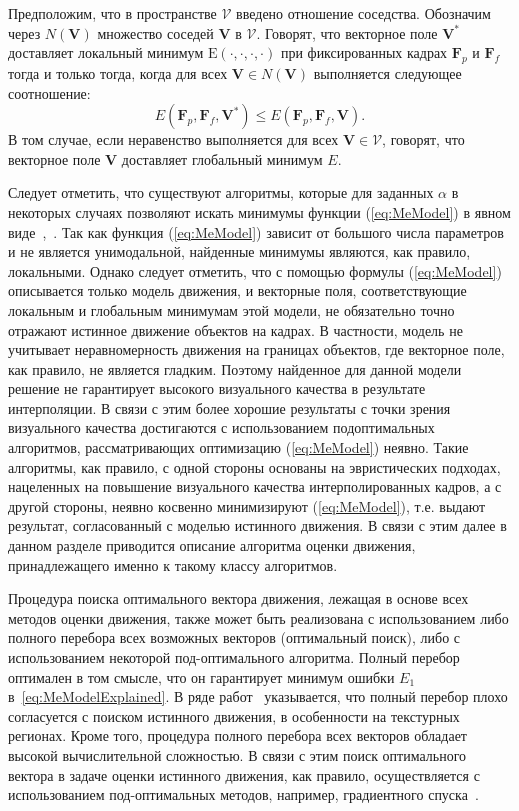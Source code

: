 Предположим, что в пространстве $\mathcal{V}$ введено отношение соседства. Обозначим через $N(\mathbf{V})$ множество соседей $\mathbf{V}$ в $\mathcal{V}$. Говорят, что векторное поле $\mathbf{V}^*$ доставляет локальный минимум $\mathrm{E}(\cdot,\cdot,\cdot,\cdot)$ при фиксированных кадрах $\mathbf{F}_p$ и $\mathbf{F}_f$ тогда и только тогда, когда для всех $\mathbf{V} \in N(\mathbf{V})$ выполняется следующее соотношение:
\begin{equation}
E(\mathbf{F}_p, \mathbf{F}_f, \mathbf{V}^{*}) \le E(\mathbf{F}_p, \mathbf{F}_f, \mathbf{V}).
\label{eq:Minima}
\end{equation}
В том случае, если неравенство выполняется для всех $\mathbf{V} \in \mathcal{V}$, говорят, что векторное поле $\mathbf{V}$ доставляет глобальный минимум $E$.

Следует отметить, что существуют алгоритмы, которые для заданных $\alpha$ в некоторых случаях позволяют искать минимумы функции (\ref{eq:MeModel}) в явном виде~\cite{Boykov2004},~\cite{Morales2009}. Так как функция (\ref{eq:MeModel}) зависит от большого числа параметров и не является унимодальной, найденные минимумы являются, как правило, локальными. Однако следует отметить, что с помощью формулы (\ref{eq:MeModel}) описывается только модель движения, и векторные поля, соответствующие локальным и глобальным минимумам этой модели, не обязательно точно отражают истинное движение объектов на кадрах. В частности, модель не учитывает неравномерность движения на границах объектов, где векторное поле, как правило, не является гладким. Поэтому найденное для данной модели решение не гарантирует высокого визуального качества в результате интерполяции. В связи с этим более хорошие результаты с точки зрения визуального качества достигаются с использованием подоптимальных алгоритмов, рассматривающих оптимизацию (\ref{eq:MeModel}) неявно. Такие алгоритмы, как правило, с одной стороны основаны на эвристических подходах, нацеленных на повышение визуального качества интерполированных кадров, а с другой стороны, неявно косвенно минимизируют (\ref{eq:MeModel}), т.е. выдают результат, согласованный с моделью истинного движения. В связи с этим далее в данном разделе приводится описание алгоритма оценки движения, принадлежащего именно к такому классу алгоритмов.

Процедура поиска оптимального вектора движения, лежащая в основе всех методов оценки движения, также может быть реализована с использованием либо полного перебора всех возможных векторов (оптимальный поиск), либо с использованием некоторой под-оптимального алгоритма. Полный перебор оптимален в том смысле, что он гарантирует минимум ошибки $E_1$ в~\ref{eq:MeModelExplained}. В ряде работ~\cite{Sohn2007} указывается, что полный перебор плохо согласуется с поиском истинного движения, в особенности на текстурных регионах. Кроме того, процедура полного перебора всех векторов обладает высокой вычислительной сложностью. В связи с этим поиск оптимального вектора в задаче оценки истинного движения, как правило, осуществляется с использованием под-оптимальных методов, например, градиентного спуска~\cite{Liu1996}.

